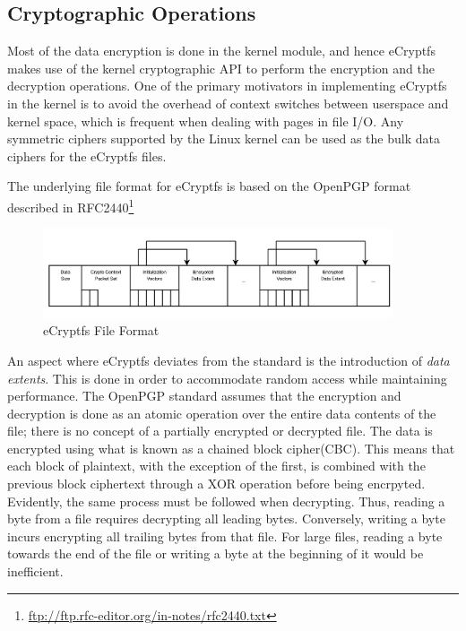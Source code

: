 \subsection{Cryptographic Operations}
\label{sub-sec:crypt-ops-ecryptfs}

Most of the data encryption is done in the kernel module, and hence eCryptfs makes use of the kernel cryptographic API to perform the encryption and the decryption operations. One of the primary motivators in implementing eCryptfs in the kernel is to avoid the overhead of context switches between userspace and kernel space, which is frequent when dealing with pages in file I/O. Any symmetric ciphers supported by the Linux kernel can be used as the bulk data ciphers for the eCryptfs files.

The underlying file format for eCryptfs is based on the OpenPGP format described in RFC2440\footnote{\url{ftp://ftp.rfc-editor.org/in-notes/rfc2440.txt}}

\begin{figure}[h!]
\centering
    \includegraphics[width=0.92\textwidth]{src/img/ecryptfs/fileformat.png}
\caption{eCryptfs File Format\cite{ecryptfs-paper}}
\end{figure}

An aspect where eCryptfs deviates from the standard is the introduction of \textit{data extents}. This is done in order to accommodate random access while maintaining performance. The OpenPGP standard assumes that the encryption and decryption is done as an atomic operation over the entire data contents of the file; there is no concept of a partially encrypted or decrypted file. The data is encrypted using what is known as a chained block cipher(CBC). This means that each block of plaintext, with the exception of the first, is combined with the previous block ciphertext through a XOR operation before being encrpyted. Evidently, the same process must be followed when decrypting. Thus, reading a byte from a file requires decrypting all leading bytes. Conversely, writing a byte incurs encrypting all trailing bytes from that file. For large files, reading a byte towards the end of the file or writing a byte at the beginning of it would be inefficient.

